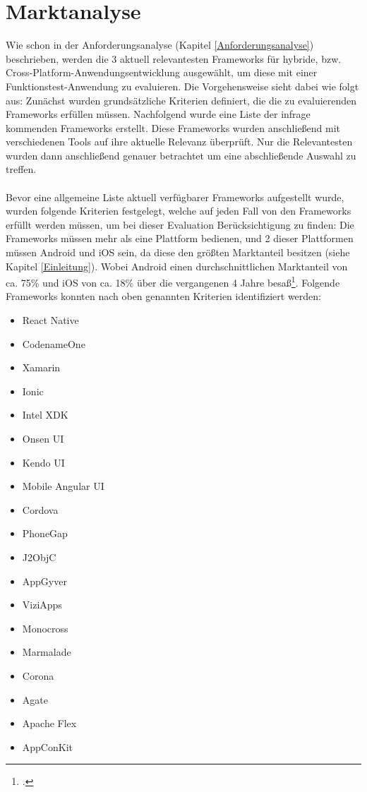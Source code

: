 \chapter{Marktanalyse} \label{Marktanalyse}

Wie schon in der Anforderungsanalyse (Kapitel \ref{Anforderungsanalyse}) beschrieben, werden die 3 aktuell relevantesten Frameworks für hybride, bzw. Cross-Platform-Anwendungsentwicklung ausgewählt, um diese mit einer Funktionstest-Anwendung zu evaluieren. Die Vorgehensweise sieht dabei wie folgt aus: Zunächst wurden grundsätzliche Kriterien definiert, die die zu evaluierenden Frameworks erfüllen müssen. Nachfolgend wurde eine Liste der infrage kommenden Frameworks erstellt. Diese Frameworks wurden anschließend mit verschiedenen Tools auf ihre aktuelle Relevanz überprüft. Nur die Relevantesten wurden dann anschließend genauer betrachtet um eine abschließende Auswahl zu treffen.
\\
\\
Bevor eine allgemeine Liste aktuell verfügbarer Frameworks aufgestellt wurde, wurden folgende Kriterien festgelegt, welche auf jeden Fall von den Frameworks erfüllt werden müssen, um bei dieser Evaluation Berücksichtigung zu finden: Die Frameworks müssen mehr als eine Plattform bedienen, und 2 dieser Plattformen müssen Android und iOS sein, da diese den größten Marktanteil besitzen (siehe Kapitel \ref{Einleitung}). Wobei Android einen durchschnittlichen Marktanteil von ca. 75\% und iOS von ca. 18\% über die vergangenen 4 Jahre besaß\footcite{Statista}.
Folgende Frameworks konnten nach oben genannten Kriterien identifiziert werden:
\\
\begin{itemize}
\item React Native
\item CodenameOne
\item Xamarin
\item Ionic
\item Intel XDK
\item Onsen UI
\item Kendo UI
\item Mobile Angular UI
\item Cordova
\item PhoneGap
\item J2ObjC
\item AppGyver
\item ViziApps
\item Monocross
\item Marmalade
\item Corona
\item Agate
\item Apache Flex
\item AppConKit
\end{itemize}

